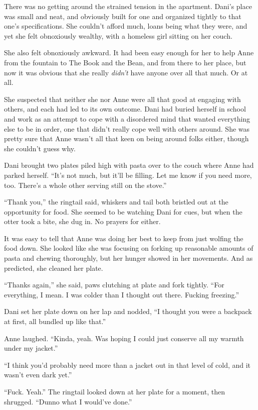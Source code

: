 There was no getting around the strained tension in the apartment. Dani's place was small and neat, and obviously built for one and organized tightly to that one's specifications. She couldn't afford much, loans being what they were, and yet she felt obnoxiously wealthy, with a homeless girl sitting on her couch.

She also felt obnoxiously awkward. It had been easy enough for her to help Anne from the fountain to The Book and the Bean, and from there to her place, but now it was obvious that she really \emph{didn't} have anyone over all that much. Or at all.

She suspected that neither she nor Anne were all that good at engaging with others, and each had led to its own outcome. Dani had buried herself in school and work as an attempt to cope with a disordered mind that wanted everything else to be in order, one that didn't really cope well with others around. She was pretty sure that Anne wasn't all that keen on being around folks either, though she couldn't guess why.

Dani brought two plates piled high with pasta over to the couch where Anne had parked herself. ``It's not much, but it'll be filling. Let me know if you need more, too. There's a whole other serving still on the stove.''

``Thank you,'' the ringtail said, whiskers and tail both bristled out at the opportunity for food. She seemed to be watching Dani for cues, but when the otter took a bite, she dug in. No prayers for either.

It was easy to tell that Anne was doing her best to keep from just wolfing the food down. She looked like she was focusing on forking up reasonable amounts of pasta and chewing thoroughly, but her hunger showed in her movements. And as predicted, she cleaned her plate.

``Thanks again,'' she said, paws clutching at plate and fork tightly. ``For everything, I mean. I was colder than I thought out there. Fucking freezing.''

Dani set her plate down on her lap and nodded, ``I thought you were a backpack at first, all bundled up like that.''

Anne laughed. ``Kinda, yeah. Was hoping I could just conserve all my warmth under my jacket.''

``I think you'd probably need more than a jacket out in that level of cold, and it wasn't even dark yet.''

``Fuck. Yeah.'' The ringtail looked down at her plate for a moment, then shrugged. ``Dunno what I would've done.''

